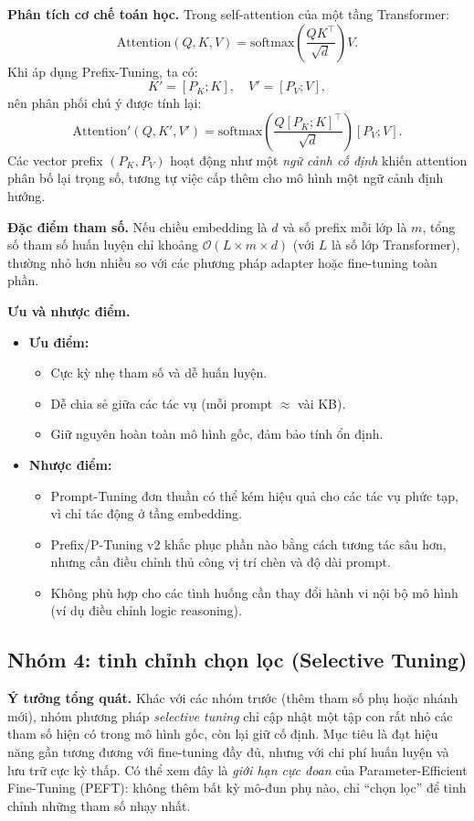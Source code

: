 \textbf{Phân tích cơ chế toán học.}  
Trong self-attention của một tầng Transformer:
\[
\text{Attention}(Q, K, V) = \text{softmax}\left( \frac{QK^\top}{\sqrt{d}} \right)V.
\]
Khi áp dụng Prefix-Tuning, ta có:
\[
K' = [P_K; K], \quad V' = [P_V; V],
\]
nên phân phối chú ý được tính lại:
\[
\text{Attention}'(Q, K', V') = \text{softmax}\left( \frac{Q [P_K; K]^\top}{\sqrt{d}} \right)[P_V; V].
\]
Các vector prefix $(P_K, P_V)$ hoạt động như một \textit{ngữ cảnh cố định} khiến attention phân bố lại trọng số, tương tự việc cấp thêm cho mô hình một ngữ cảnh định hướng.

\textbf{Đặc điểm tham số.}  
Nếu chiều embedding là $d$ và số prefix mỗi lớp là $m$, tổng số tham số huấn luyện chỉ khoảng $\mathcal{O}(L \times m \times d)$ (với $L$ là số lớp Transformer), thường nhỏ hơn nhiều so với các phương pháp adapter hoặc fine-tuning toàn phần.

\textbf{Ưu và nhược điểm.}
\begin{itemize}
	\item \textbf{Ưu điểm:}
	\begin{itemize}
		\item Cực kỳ nhẹ tham số và dễ huấn luyện.  
		\item Dễ chia sẻ giữa các tác vụ (mỗi prompt $\approx$ vài KB).  
		\item Giữ nguyên hoàn toàn mô hình gốc, đảm bảo tính ổn định.  
	\end{itemize}
	\item \textbf{Nhược điểm:}
	\begin{itemize}
		\item Prompt-Tuning đơn thuần có thể kém hiệu quả cho các tác vụ phức tạp, vì chỉ tác động ở tầng embedding.  
		\item Prefix/P-Tuning v2 khắc phục phần nào bằng cách tương tác sâu hơn, nhưng cần điều chỉnh thủ công vị trí chèn và độ dài prompt.  
		\item Không phù hợp cho các tình huống cần thay đổi hành vi nội bộ mô hình (ví dụ điều chỉnh logic reasoning).  
	\end{itemize}
\end{itemize}

\subsection{Nhóm 4: tinh chỉnh chọn lọc (Selective Tuning)}
\label{ssec:selective}

\textbf{Ý tưởng tổng quát.}  
Khác với các nhóm trước (thêm tham số phụ hoặc nhánh mới), nhóm phương pháp \textit{selective tuning} chỉ cập nhật một tập con rất nhỏ các tham số hiện có trong mô hình gốc, còn lại giữ cố định.
Mục tiêu là đạt hiệu năng gần tương đương với fine-tuning đầy đủ, nhưng với chi phí huấn luyện và lưu trữ cực kỳ thấp.  
Có thể xem đây là \emph{giới hạn cực đoan} của Parameter-Efficient Fine-Tuning (PEFT): không thêm bất kỳ mô-đun phụ nào, chỉ “chọn lọc” để tinh chỉnh những tham số nhạy nhất.

